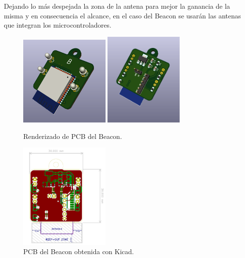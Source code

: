\documentclass[paper=a4, fontsize=11pt,twoside]{scrartcl}	%
\begin{document}
        Dejando lo más despejada la zona de la antena para mejor la ganancia de la misma y en consecuencia el alcance, en el caso 
        del Beacon se usarán las antenas que integran los microcontroladores.
        \begin{center}
            \begin{figure}[ht]
                \centering
                \includegraphics[width=0.4\textwidth]{../emiter_1.PNG}
                \includegraphics[width=0.35\textwidth]{../emiter_2.PNG}
                \caption{Renderizado de PCB del Beacon.}
                \label{fig:mesh8}
            \end{figure}    
        \end{center}
        \begin{center}
            \begin{figure}[ht]
                \centering
                \includegraphics[width=0.40\textwidth]{../emiter_PCB.PNG}
                \caption{PCB del Beacon obtenida con Kicad.}
                \label{fig:mesh9}
            \end{figure}    
        \end{center}
\end{document}
